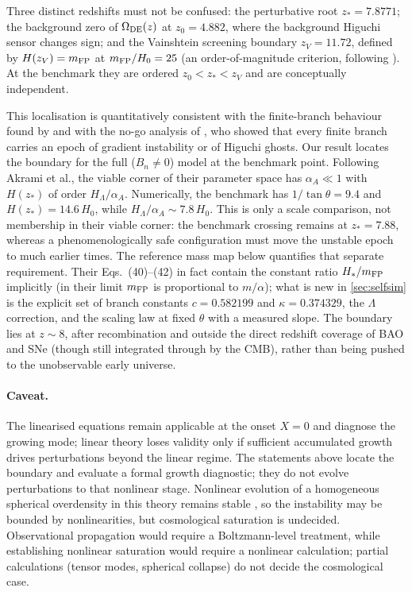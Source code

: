 Three distinct redshifts must not be confused: the perturbative root $z_*=7.8771$; the background zero of $\Omega_{\mathrm{DE}}(z)$ at $z_0=4.882$, where the background Higuchi sensor changes sign; and the Vainshtein screening boundary $z_V=11.72$, defined by $H(z_V)=m_{\mathrm{FP}}$ at $m_{\mathrm{FP}}/H_0=25$ (an order-of-magnitude criterion, following \citealp{Luben2020}). At the benchmark they are ordered $z_0<z_*<z_V$ and are conceptually independent.

This localisation is quantitatively consistent with the finite-branch behaviour found by \citet{Akrami2015} and with the no-go analysis of \citet{Konnig2015}, who showed that every finite branch carries an epoch of gradient instability or of Higuchi ghosts. Our result locates the boundary for the full ($B_n\neq0$) model at the benchmark point. Following Akrami et al., the viable corner of their parameter space has $\alpha_A\ll1$ with $H(z_*)$ of order $H_\Lambda/\alpha_A$. Numerically, the benchmark has $1/\tan\theta=9.4$ and $H(z_*)=14.6\,H_0$, while $H_\Lambda/\alpha_A\sim7.8\,H_0$. This is only a scale comparison, not membership in their viable corner: the benchmark crossing remains at $z_*=7.88$, whereas a phenomenologically safe configuration must move the unstable epoch to much earlier times. The reference mass map below quantifies that separate requirement. Their Eqs.~(40)--(42) in fact contain the constant ratio $H_*/m_{\mathrm{FP}}$ implicitly (in their limit $m_{\mathrm{FP}}$ is proportional to $m/\alpha$); what is new in \cref{sec:selfsim} is the explicit set of branch constants $c=0.582199$ and $\kappa=0.374329$, the $\Lambda$ correction, and the scaling law at fixed $\theta$ with a measured slope. The boundary lies at $z\sim8$, after recombination and outside the direct redshift coverage of BAO and SNe (though still integrated through by the CMB), rather than being pushed to the unobservable early universe.

\paragraph{Caveat.}
The linearised equations remain applicable at the onset $X=0$ and diagnose the growing mode; linear theory loses validity only if sufficient accumulated growth drives perturbations beyond the linear regime. The statements above locate the boundary and evaluate a formal growth diagnostic; they do not evolve perturbations to that nonlinear stage. Nonlinear evolution of a homogeneous spherical overdensity in this theory remains stable \citep{Hogas2020stab}, so the instability may be bounded by nonlinearities, but cosmological saturation is undecided. Observational propagation would require a Boltzmann-level treatment, while establishing nonlinear saturation would require a nonlinear calculation; partial calculations (tensor modes, spherical collapse) do not decide the cosmological case.

